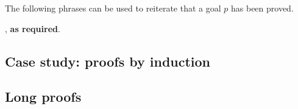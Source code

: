 \todo{}

\begin{vocabulary}
The following phrases can be used to reiterate that a goal $p$ has been proved.

\begin{vocabtemplate}
 , \textbf{as required}.
\end{vocabtemplate}
\end{vocabulary}

\todo{}

\subsection*{Case study: proofs by induction}

\todo{}

\subsection*{Long proofs}

\todo{}